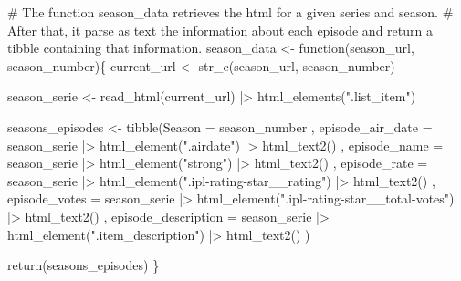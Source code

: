 \documentclass[
  letterpaper,
  DIV=11,
  numbers=noendperiod]{scrartcl}
\newenvironment{Shaded}{\begin{snugshade}}{\end{snugshade}}
\newcommand{\AttributeTok}[1]{\textcolor[rgb]{0.40,0.45,0.13}{#1}}
\newcommand{\CommentTok}[1]{\textcolor[rgb]{0.37,0.37,0.37}{#1}}
\newcommand{\ControlFlowTok}[1]{\textcolor[rgb]{0.00,0.23,0.31}{#1}}
\newcommand{\FunctionTok}[1]{\textcolor[rgb]{0.28,0.35,0.67}{#1}}
\newcommand{\NormalTok}[1]{\textcolor[rgb]{0.00,0.23,0.31}{#1}}
\newcommand{\OtherTok}[1]{\textcolor[rgb]{0.00,0.23,0.31}{#1}}
\newcommand{\SpecialCharTok}[1]{\textcolor[rgb]{0.37,0.37,0.37}{#1}}
\newcommand{\StringTok}[1]{\textcolor[rgb]{0.13,0.47,0.30}{#1}}
\begin{document}
\begin{Shaded}
\begin{Highlighting}[]
\CommentTok{\# The function season\_data retrieves the html for a given series and season.}
\CommentTok{\# After that, it parse as text the information about each episode and return a tibble containing that information.}
\NormalTok{season\_data }\OtherTok{\textless{}{-}} \ControlFlowTok{function}\NormalTok{(season\_url, season\_number)\{}
\NormalTok{  current\_url }\OtherTok{\textless{}{-}}  \FunctionTok{str\_c}\NormalTok{(season\_url, season\_number)}
  
\NormalTok{  season\_serie }\OtherTok{\textless{}{-}} \FunctionTok{read\_html}\NormalTok{(current\_url) }\SpecialCharTok{|\textgreater{}} 
    \FunctionTok{html\_elements}\NormalTok{(}\StringTok{".list\_item"}\NormalTok{)}
  
\NormalTok{  seasons\_episodes }\OtherTok{\textless{}{-}} \FunctionTok{tibble}\NormalTok{(}\AttributeTok{Season =}\NormalTok{ season\_number}
\NormalTok{                             , }\AttributeTok{episode\_air\_date =}\NormalTok{ season\_serie }\SpecialCharTok{|\textgreater{}} \FunctionTok{html\_element}\NormalTok{(}\StringTok{".airdate"}\NormalTok{) }\SpecialCharTok{|\textgreater{}} \FunctionTok{html\_text2}\NormalTok{()}
\NormalTok{                             , }\AttributeTok{episode\_name =}\NormalTok{ season\_serie }\SpecialCharTok{|\textgreater{}} \FunctionTok{html\_element}\NormalTok{(}\StringTok{"strong"}\NormalTok{) }\SpecialCharTok{|\textgreater{}} \FunctionTok{html\_text2}\NormalTok{()}
\NormalTok{                             , }\AttributeTok{episode\_rate =}\NormalTok{ season\_serie }\SpecialCharTok{|\textgreater{}} \FunctionTok{html\_element}\NormalTok{(}\StringTok{".ipl{-}rating{-}star\_\_rating"}\NormalTok{) }\SpecialCharTok{|\textgreater{}} \FunctionTok{html\_text2}\NormalTok{()}
\NormalTok{                             , }\AttributeTok{episode\_votes =}\NormalTok{ season\_serie }\SpecialCharTok{|\textgreater{}} \FunctionTok{html\_element}\NormalTok{(}\StringTok{".ipl{-}rating{-}star\_\_total{-}votes"}\NormalTok{) }\SpecialCharTok{|\textgreater{}} \FunctionTok{html\_text2}\NormalTok{()}
\NormalTok{                             , }\AttributeTok{episode\_description =}\NormalTok{ season\_serie }\SpecialCharTok{|\textgreater{}} \FunctionTok{html\_element}\NormalTok{(}\StringTok{".item\_description"}\NormalTok{) }\SpecialCharTok{|\textgreater{}} \FunctionTok{html\_text2}\NormalTok{()}
\NormalTok{  )}
  
  \FunctionTok{return}\NormalTok{(seasons\_episodes)}
\NormalTok{\}}
\end{Highlighting}
\end{Shaded}
\end{document}
